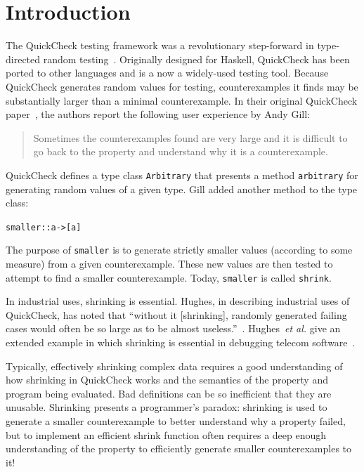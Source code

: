 \documentclass{sigplanconf}
\newenvironment{code}{\begin{alltt}}{\end{alltt}}
\newcommand{\ttp}[1]{\texttt{#1}}
\begin{document}
\section{Introduction}\label{sec:intro}
The QuickCheck testing framework was a revolutionary step-forward in
type-directed random testing~\cite{qc}.  Originally designed for Haskell,
QuickCheck has been ported to other languages and is a now a widely-used testing
tool.  Because QuickCheck generates random values for testing, counterexamples
it finds may be substantially larger than a minimal counterexample.  In their
original QuickCheck paper~\cite{qc}, the authors report the following user
experience by Andy Gill:
%
\begin{quote}
Sometimes the counterexamples found are very large and it is difficult to go
back to the property and understand why it is a counterexample.
\end{quote}
%
\noindent
QuickCheck defines a type class \ttp{Arbitrary} that presents a method
\ttp{arbitrary} for generating random values of a given type.  Gill added another
method to the type class:
%
\begin{code}
smaller :: a -> [a]
\end{code}
%
\noindent
The purpose of \ttp{smaller} is to generate strictly smaller values (according
to some measure) from a given counterexample.  These new values are then tested
to attempt to find a smaller counterexample.  Today, \ttp{smaller} is called
\ttp{shrink}.

In industrial uses, shrinking is essential.  Hughes, in describing industrial
uses of QuickCheck, has noted that ``without it [shrinking], randomly generated
failing cases would often be so large as to be almost useless.''~\cite{qcjh}.
Hughes~\emph{et al.} give an extended example in which shrinking is essential in
debugging telecom software~\cite{telecom}.

Typically, effectively shrinking complex data requires a good understanding of
how shrinking in QuickCheck works and the semantics of the property and program
being evaluated.  Bad definitions can be so inefficient that they are unusable.
Shrinking presents a programmer's paradox: shrinking is used to generate a
smaller counterexample to better understand why a property failed, but to
implement an efficient shrink function often requires a deep enough
understanding of the property to efficiently generate smaller counterexamples to
it!
\end{document}
